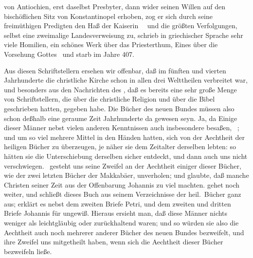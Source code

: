 \begin{aufza}
\begin{aufzb}
\item {} von Antiochien, erst daselbst Presbyter, dann wider seinen Willen auf den bischöflichen Sitz von Konstantinopel erhoben, zog er sich durch seine freimüthigen Predigten den Haß der Kaiserin~\  und die größten Verfolgungen, selbst eine zweimalige Landesverweisung zu, schrieb in griechischer Sprache sehr viele Homilien, ein schönes Werk über das Priesterthum, Eines über die Vorsehung Gottes \uA\ und starb im Jahre 407.
\end{aufzb}
\item Aus diesen Schriftstellern ersehen wir offenbar, daß im fünften und vierten Jahrhunderte die christliche Kirche schon in allen drei Welttheilen verbreitet war, und besonders aus den Nachrichten des , daß es bereits eine sehr große Menge von Schriftstellern, die über die christliche Religion und über die Bibel geschrieben hatten, gegeben habe. Die Bücher des neuen Bundes müssen also schon deßhalb eine geraume Zeit  Jahrhunderte da gewesen seyn. Ja, da Einige dieser Männer nebst vielen anderen Kenntnissen auch insbesondere  besaßen, \zB\ ; und um so viel mehrere Mittel in den Händen hatten, sich von der Aechtheit der heiligen Bücher zu überzeugen, je näher sie dem Zeitalter derselben lebten: so hätten sie die Unterschiebung derselben sicher entdeckt, und dann auch uns nicht verschwiegen.  \zB\ gesteht uns seine Zweifel an der Aechtheit einiger dieser Bücher, wie der zwei letzten Bücher der Makkabäer, unverholen; und  glaubte, daß manche Christen seiner Zeit aus der Offenbarung Johannis zu viel machten.  gehet noch weiter, und schließt dieses Buch aus seinem Verzeichnisse der heil.\ Bücher ganz aus;  erklärt es nebst dem zweiten Briefe Petri, und dem zweiten und dritten Briefe Johannis für ungewiß. Hieraus ersieht man, daß diese Männer nichts weniger als leichtgläubig oder zurückhaltend waren; und so würden sie also die Aechtheit auch noch mehrerer anderer Bücher des neuen Bundes bezweifelt, und ihre Zweifel uns mitgetheilt haben, wenn sich die Aechtheit dieser Bücher bezweifeln ließe.
\end{aufza}

